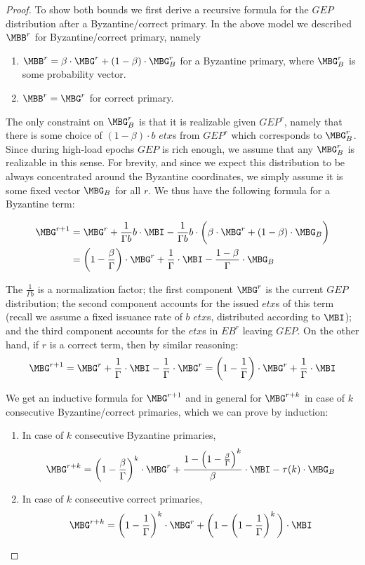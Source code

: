 \begin{proof}
	To show both bounds we first derive a recursive formula for the $GEP$ distribution after a Byzantine/correct primary. In the above model we described $\MBB^r$ for Byzantine/correct primary, namely 
    \begin{enumerate}
        \item $\MBB^r=\beta\cdot \MBG^r +(1-\beta)\cdot \MBG^r_B$ for a Byzantine primary, where $\MBG_B^r$ is some probability vector.
        \item $\MBB^r=\MBG^r$ for correct primary.
    \end{enumerate}
     The only constraint on $\MBG^r_B$ is that it is realizable given $GEP^r$, namely that there is some choice of $(1-\beta)\cdot b$ $etx$s from $GEP^r$ which corresponds to $\MBG^r_B$. Since during high-load epochs $GEP$ is rich enough, we assume that any $\MBG^r_B$ is realizable in this sense. For brevity, and since we expect this distribution to be always concentrated around the Byzantine coordinates, we simply assume it is some fixed vector $\MBG_B$ for all $r$. We thus have the following formula for a Byzantine term:
	
    \begin{equation}\begin{split}\MBG^{r+1}&=\MBG^r+\frac{1}{\Gamma b}b\cdot\MBI-\frac{1}{\Gamma b}b\cdot\bigg(\beta \cdot\MBG^r+(1-\beta)\cdot \MBG_B\bigg)\\
    &=\left(1-\frac{\beta}{\Gamma}\right)\cdot \MBG^r+\frac{1}{\Gamma}\cdot\MBI-\frac{1-\beta}{\Gamma}\cdot \MBG_B
    \end{split}\end{equation}
    
	The $\frac{1}{\Gamma b}$ is a normalization factor; the first component $\MBG^r$ is the current $GEP$ distribution; the second component accounts for the issued $etx$s of this term (recall we assume a fixed issuance rate of $b$ $etx$s, distributed according to $\MBI$); and the third component accounts for the $etx$s in $EB^r$ leaving $GEP$. On the other hand, if $r$ is a correct term, then by similar reasoning:
	$$\MBG^{r+1}=\MBG^r+\frac{1}{\Gamma }\cdot\MBI-\frac{1}{\Gamma }\cdot\MBG^r=\left(1-\frac{1}{\Gamma}\right)\cdot \MBG^r+\frac{1}{\Gamma}\cdot \MBI$$
	 
	We get an inductive formula for $\MBG^{r+1}$ and in general for $\MBG^{r+k}$ in case of $k$ consecutive Byzantine/correct primaries, which we can prove by induction:
	\begin{enumerate} 
		\item In case of $k$ consecutive Byzantine primaries,            $$\MBG^{r+k}=\left(1-\frac{\beta}{\Gamma}\right)^k\cdot \MBG^r+\frac{1-\left(1-\frac{\beta}{\Gamma}\right)^{k}}{\beta}\cdot\MBI-\tau(k)\cdot \MBG_B$$
		\item In case of $k$ consecutive correct primaries, 
        $$\MBG^{r+k}=\left(1-\frac{1}{\Gamma}\right)^k\cdot \MBG^r +\bigg(1-\left(1-\frac{1}{\Gamma}\right)^k\bigg)\cdot \MBI$$
	\end{enumerate}


\end{proof}
